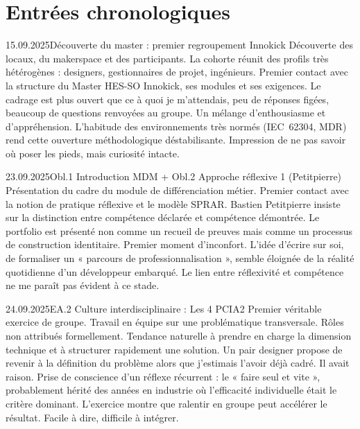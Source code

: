 \section{Entrées chronologiques}


\begin{jbentry}{15.09.2025}{Découverte du master : premier regroupement Innokick}{}
\jbobs
Découverte des locaux, du makerspace et des participants. La cohorte réunit des profils très hétérogènes : designers, gestionnaires de projet, ingénieurs. Premier contact avec la structure du Master HES-SO Innokick, ses modules et ses exigences. Le cadrage est plus ouvert que ce à quoi je m'attendais, peu de réponses figées, beaucoup de questions renvoyées au groupe.
\jbres
Un mélange d'enthousiasme et d'appréhension. L'habitude des environnements très normés (IEC~62304, MDR) rend cette ouverture méthodologique déstabilisante. Impression de ne pas savoir où poser les pieds, mais curiosité intacte.
\end{jbentry}

\begin{jbentry}{23.09.2025}{Obl.1 Introduction MDM + Obl.2 Approche réflexive 1 (Petitpierre)}{}
\jbobs
Présentation du cadre du module de différenciation métier. Premier contact avec la notion de pratique réflexive et le modèle SPRAR. Bastien Petitpierre insiste sur la distinction entre compétence déclarée et compétence démontrée. Le portfolio est présenté non comme un recueil de preuves mais comme un processus de construction identitaire.
\jbres
Premier moment d'inconfort. L'idée d'écrire sur soi, de formaliser un « parcours de professionnalisation », semble éloignée de la réalité quotidienne d'un développeur embarqué. Le lien entre réflexivité et compétence ne me paraît pas évident à ce stade.
\end{jbentry}

\begin{jbentry}{24.09.2025}{EA.2 Culture interdisciplinaire : Les 4 PCI}{A2}
\jbobs
Premier véritable exercice de groupe. Travail en équipe sur une problématique transversale. Rôles non attribués formellement. Tendance naturelle à prendre en charge la dimension technique et à structurer rapidement une solution. Un pair designer propose de revenir à la définition du problème alors que j'estimais l'avoir déjà cadré. Il avait raison.
\jbres
Prise de conscience d'un réflexe récurrent : le « faire seul et vite », probablement hérité des années en industrie où l'efficacité individuelle était le critère dominant. L'exercice montre que ralentir en groupe peut accélérer le résultat. Facile à dire, difficile à intégrer.
\end{jbentry}

